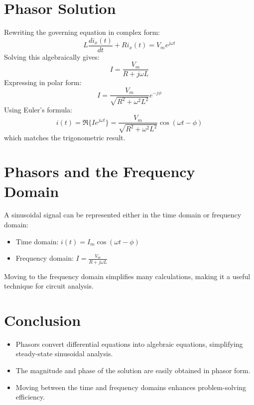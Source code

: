 \documentclass{article}
\begin{document}
\section{Phasor Solution}
Rewriting the governing equation in complex form:
\begin{equation}
    L \frac{d i_x(t)}{dt} + R i_x(t) = V_m e^{j \omega t}
\end{equation}
Solving this algebraically gives:
\begin{equation}
    I = \frac{V_m}{R + j \omega L}
\end{equation}
Expressing in polar form:
\begin{equation}
    I = \frac{V_m}{\sqrt{R^2 + \omega^2 L^2}} e^{-j \phi}
\end{equation}
Using Euler's formula:
\begin{equation}
    i(t) = \Re\{ I e^{j \omega t} \} = \frac{V_m}{\sqrt{R^2 + \omega^2 L^2}} \cos(\omega t - \phi)
\end{equation}
which matches the trigonometric result.

\section{Phasors and the Frequency Domain}
A sinusoidal signal can be represented either in the time domain or frequency domain:
\begin{itemize}
    \item Time domain: $i(t) = I_m \cos(\omega t - \phi)$
    \item Frequency domain: $I = \frac{V_m}{R + j \omega L}$
\end{itemize}
Moving to the frequency domain simplifies many calculations, making it a useful technique for circuit analysis.

\section{Conclusion}
\begin{itemize}
    \item Phasors convert differential equations into algebraic equations, simplifying steady-state sinusoidal analysis.
    \item The magnitude and phase of the solution are easily obtained in phasor form.
    \item Moving between the time and frequency domains enhances problem-solving efficiency.
\end{itemize}
\end{document}
